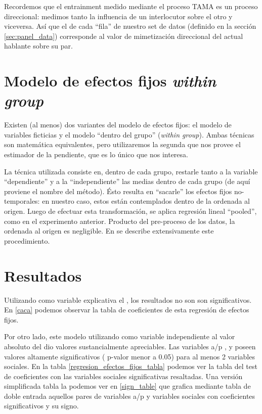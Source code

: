 Recordemos que el entrainment medido mediante el proceso TAMA es un proceso direccional: medimos tanto la influencia de un interlocutor sobre el otro y viceversa. Así que el \entrainment de cada ``fila'' de nuestro set de datos (definido en la sección \ref{sec:panel_data}) corresponde al valor de mimetización direccional del actual hablante sobre su par.


\section{Modelo de efectos fijos \emph{within group}}

Existen (al menos) dos variantes del modelo de efectos fijos: el modelo de variables ficticias y el modelo ``dentro del grupo'' (\emph{within group}). Ambas técnicas son matemática equivalentes, pero utilizaremos la segunda que nos provee el estimador de la pendiente, que es lo único que nos interesa.

La técnica utilizada consiste en, dentro de cada grupo, restarle tanto a la variable ``dependiente'' y a la ``independiente'' las medias dentro de cada grupo (de aquí proviene el nombre del método). Ésto resulta en ``sacarle'' los efectos fijos no-temporales: en nuestro caso, estos están contemplados dentro de la ordenada al origen. Luego de efectuar esta transformación, se aplica regresión lineal ``pooled'', como en el experimento anterior. Producto del pre-proceso de los datos, la ordenada al origen es negligible. En \cite[chap 16]{gujarati1999} se describe extensivamente este procedimiento.


\section{Resultados}

Utilizando como variable explicativa el \entrainment, los resultados no son son significativos. En \ref{caca} podemos observar la tabla de coeficientes de esta regresión de efectos fijos.


Por otro lado, este modelo utilizando como variable independiente al valor absoluto del \entrainment dio valores sustancialmente apreciables. Las variables a/p \ENGMAX, \FOMEAN y \NOISETOHARMONICS poseen valores altamente significativos ( p-valor menor a 0.05) para al menos 2 variables sociales. En la tabla \ref{regresion_efectos_fijos_tabla} podemos ver la tabla del test de coeficientes con las variables sociales significativas resaltadas. Una versión simplificada tabla la podemos ver en \ref{sign_table} que grafica mediante tabla de doble entrada aquellos pares de variables a/p y variables sociales con coeficientes significativos y su signo.

